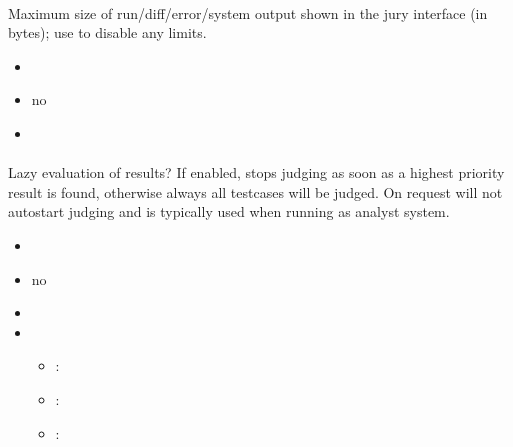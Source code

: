 \documentclass[a4paper,10pt,english,openany]{sphinxmanual}
\begin{document}
\paragraph{}
\label{\detokenize{configuration-reference:output-display-limit}}
\sphinxAtStartPar
Maximum size of run/diff/error/system output shown in the jury interface (in bytes); use  to disable any limits.
\begin{itemize}
\item {} 
\sphinxAtStartPar
{} 

\item {} 
\sphinxAtStartPar
{} no

\item {} 
\sphinxAtStartPar
{} 

\end{itemize}


\paragraph{}
\label{\detokenize{configuration-reference:lazy-eval-results}}
\sphinxAtStartPar
Lazy evaluation of results? If enabled, stops judging as soon as a highest priority result is found, otherwise always all testcases will be judged. On request will not auto\sphinxhyphen{}start judging and is typically used when running as analyst system.
\begin{itemize}
\item {} 
\sphinxAtStartPar
{} 

\item {} 
\sphinxAtStartPar
{} no

\item {} 
\sphinxAtStartPar
{} 

\item {} 
\sphinxAtStartPar
{}
\begin{itemize}
\item {} 
\sphinxAtStartPar
{}: 

\item {} 
\sphinxAtStartPar
{}: 

\item {} 
\sphinxAtStartPar
{}: 

\end{itemize}

\end{itemize}
\end{document}

